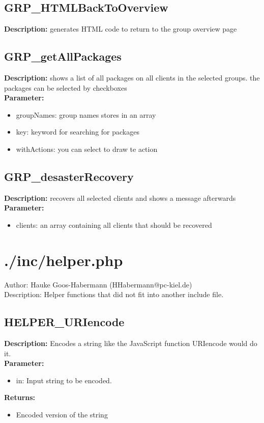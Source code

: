 \subsection{GRP\_HTMLBackToOverview}
\textbf{Description:} generates HTML code to return to the group overview page\\

\subsection{GRP\_getAllPackages}
\textbf{Description:} shows a list of all packages on all clients in the selected groups. the packages can be selected by checkboxes\\
\textbf{Parameter:}
\begin{itemize}
\item groupNames: group names stores in an array
\item key: keyword for searching for packages
\item withActions: you can select to draw te action 
\end{itemize}

\subsection{GRP\_desasterRecovery}
\textbf{Description:} recovers all selected clients and shows a message afterwards\\
\textbf{Parameter:}
\begin{itemize}
\item clients: an array containing all clients that should be recovered
\end{itemize}

\newpage\section{./inc/helper.php}
 Author: Hauke Goos-Habermann (HHabermann@pc-kiel.de)\\
 Description: Helper functions that did not fit into another include file.\\

\subsection{HELPER\_URIencode}
\textbf{Description:} Encodes a string like the JavaScript function URIencode would do it.\\
\textbf{Parameter:}
\begin{itemize}
\item in: Input string to be encoded.
\end{itemize}
\textbf{Returns:}
\begin{itemize}
\item Encoded version of the string
\end{itemize}


